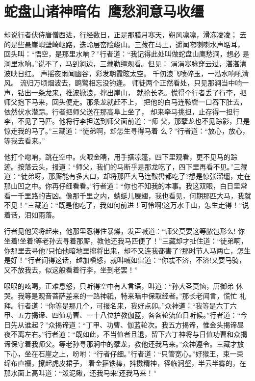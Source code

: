 \chapter{蛇盘山诸神暗佑~鹰愁涧意马收缰}

却说行者伏侍唐僧西进，行经数日，正是那腊月寒天，朔风凛凛，滑冻凌凌；
去的是些悬崖峭壁崎岖路，迭岭层峦险峻山。三藏在马上，遥闻唿喇喇水声聒耳，
回头叫：“悟空，是那里水响？”行者道：“我记得此处叫做蛇盘山鹰愁涧，想必
是涧里水响。”说不了，马到涧边，三藏勒缰观看。但见：
涓涓寒脉穿云过，湛湛清波映日红。
声摇夜雨闻幽谷，彩发朝霞眩太空。
千仞浪飞喷碎玉，一泓水响吼清风。
流归万顷烟波去，鸥鹭相忘没钓逢。
师徒两个正然看处，只见那涧当中响一声，钻出一条龙来，推波掀浪，撺出崖山，
就抢长老。慌得个行者丢了行李，把师父抱下马来，回头便走。那条龙就赶不上，
把他的白马连鞍辔一口吞下肚去，依然伏水潜踪。行者把师父送在那高阜上坐了，
却来牵马挑担，止存得一担行李，不见了马匹。他将行李担送到师父面前道：“师
父，那孽龙也不见踪影，只是惊走我的马了。”三藏道：“徒弟啊，却怎生寻得马着
么？”行者道：“放心，放心，等我去看来。”

他打个唿哨，跳在空中。火眼金睛，用手搭凉篷，四下里观看，更不见马的踪
迹。按落云头，报道：“师父，我们的马断乎是那龙吃了，四下里再看不见。”三藏
道：“徒弟呀，那厮能有多大口，却将那匹大马连鞍辔都吃了?想是惊张溜缰，走在
那山凹之中。你再仔细看看。”行者道：“你也不知我的本事。我这双眼，白日里常
看一千里路的吉凶。像那千里之内，蜻蜓儿展翅，我也看见，何期那匹大马，我就
不见！”三藏道：“既是他吃了，我如何前进！可怜啊!这万水千山，怎生走得！”说
着话，泪如雨落。

行者见他哭将起来，他那里忍得住暴燥，发声喊道：“师父莫要这等脓包形么!
你坐着!坐着!等老孙去寻着那厮，教他还我马匹便了！”三藏却才扯住道：“徒弟啊，
你那里去寻他?只怕他暗地里撺将出来，却不又连我都害了?那时节人马两亡，怎生
是好！”行者闻得这话，越加嗔怒，就叫喊如雷道：“你忒不济，不济!又要马骑，
又不放我去，似这般看着行李，坐到老罢！”

哏哏的吆喝，正难息怒，只听得空中有人言语，叫道：“孙大圣莫恼，唐御弟
休哭。我等是观音菩萨差来的一路神祇，特来暗中保取经者。”那长老闻言，慌忙
礼拜。行者道：“你等是那几个，可报名来，我好点卯。”众神道：“我等是六丁六
甲、五方揭谛、四值功曹、一十八位护教伽蓝，各各轮流值日听候。”行者道：“今
日先从谁起？”众揭谛道：“丁甲、功曹、伽蓝轮次。我五方揭谛，惟金头揭谛昼
夜不离左右。”行者道：“既如此，不当值者且退，留下六丁神将与日值功曹和众揭
谛保守着我师父。等老孙寻那涧中的孽龙，教他还我马来。”众神遵令。三藏才放
下心，坐在石崖之上，吩咐：“行者仔细。”行者道：“只管宽心。”好猴王，束一束
绵布直裰，撩起虎皮裙子，着金箍铁棒，抖擞精神，径临涧壑，半云半雾的，在
那水面上高叫道：“泼泥鳅，还我马来!还我马来！”

